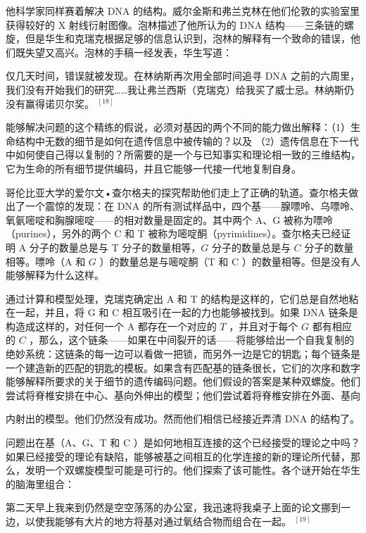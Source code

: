 他科学家同样赛着解决 DNA 的结构。威尔金斯和弗兰克林在他们伦敦的实验室里获得较好的 X 射线衍射图像。泡林描述了他所认为的 DNA 结构——三条链的螺旋，但是华生和克瑞克根据足够的信息认识到，泡林的解释有一个致命的错误，他们既失望又高兴。泡林的手稿一经发表，华生写道：

\begin{displayquote}
仅几天时间，错误就被发现。在林纳斯再次用全部时间追寻 DNA 之前的六周里，我们没有开始我们的研究……我让弗兰西斯（克瑞克）给我买了威士忌。林纳斯仍没有赢得诺贝尔奖。 ${ }^{[18]}$
\end{displayquote}

能够解决问题的这个精练的假说，必须对基因的两个不同的能力做出解释：（1）生命结构中无数的细节是如何在遗传信息中被传输的？以及 （2）遗传信息在下一代中如何使自己得以复制的？所需要的是一个与已知事实和理论相一致的三维结构，它为生命的所有细节提供编码，并且它能够一代接一代地复制自身。

哥伦比亚大学的爱尔文•查尔格夫的探究帮助他们走上了正确的轨道。查尔格夫做出了一个震惊的发现：在 DNA 的所有测试样品中，四个基——腺嘌呤、乌嘌呤、氧氨嘧啶和胸腺嘧啶——的相对数量是固定的。其中两个 $\mathrm{A} 、 \mathrm{G}$ 被称为嘌呤（purines），另外的两个 C 和 T 被称为嘧啶酮（pyrimidines）。查尔格夫已经证明 A 分子的数量总是与 T 分子的数量相等，$G$ 分子的数量总是与 $C$ 分子的数量相等。嘌呤（A 和 $G$ ）的数量总是与嘧啶酮（T 和 C ）的数量相等。但是没有人能够解释为什么这样。

通过计算和模型处理，克瑞克确定出 A 和 T 的结构是这样的，它们总是自然地粘在一起，并且，将 G 和 C 相互吸引在一起的力也能够被找到。如果 DNA 链条是构造成这样的，对任何一个 A 都存在一个对应的 $T$ ，并且对于每个 $G$ 都有相应的 $C$ ，那么，这个链条——如果在中间裂开的话——将能够给出一个自我复制的绝妙系统：这链条的每一边可以看做一把锁，而另外一边是它的钥匙；每个链条是一个建造新的匹配的钥匙的模板。如果含有匹配基的链条很长，它们的次序和数字能够解释所要求的关于细节的遗传编码问题。他们假设的答案是某种双螺旋。他们尝试将脊椎安排在中心、基向外伸出的模型；他们尝试着将脊椎安排在外面、基向

内射出的模型。他们仍然没有成功。然而他们相信已经接近弄清 DNA 的结构了。

问题出在基（A、G、T 和 C ）是如何地相互连接的这个已经接受的理论之中吗？如果已经接受的理论有缺陷，能够被基之间相互的化学连接的新的理论所代替，那么，发明一个双螺旋模型可能是可行的。他们探索了该可能性。各个谜开始在华生的脑海里组合：

第二天早上我来到仍然是空空荡荡的办公室，我迅速将我桌子上面的论文挪到一边，以使我能够有大片的地方将基对通过氧结合物而组合在一起。 ${ }^{[19]}$


